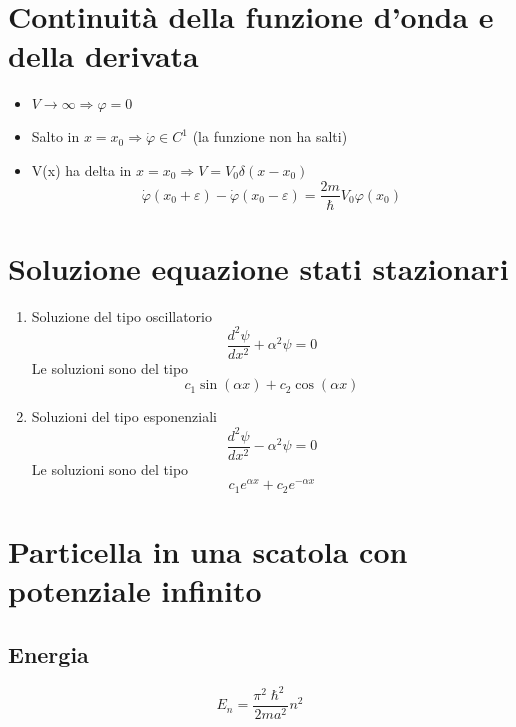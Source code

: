 \documentclass[a4paper,11pt]{report}
\theoremstyle{remark}
\theoremstyle{definition}
\begin{document}
\section{Continuità della funzione d'onda e della derivata}

\begin{itemize}
    \item $V \to \infty \Rightarrow \varphi = 0$
    \item Salto in $x = x_0 \Rightarrow \dot{\varphi} \in C^1$ (la funzione non ha salti)
    \item V(x) ha delta in $x = x_0 \Rightarrow V = V_0 \delta(x-x_0)$
    \begin{equation*}
        \dot{\varphi}(x_0 + \varepsilon) - \dot{\varphi}(x_0 - \varepsilon) = \frac{2m}{\hslash}V_0 \varphi(x_0)
    \end{equation*}
\end{itemize}

\section{Soluzione equazione stati stazionari}

\begin{enumerate}
    \item Soluzione del tipo oscillatorio
    \begin{equation*}
        \frac{d^2 \psi}{dx^2} + \alpha^2\psi = 0
    \end{equation*}
    Le soluzioni sono del tipo
    \begin{equation*}
        c_1\sin(\alpha x) + c_2\cos(\alpha x)
    \end{equation*}
    \item Soluzioni del tipo esponenziali
    \begin{equation*}
        \frac{d^2 \psi}{dx^2} - \alpha^2\psi = 0
    \end{equation*}
    Le soluzioni sono del tipo
    \begin{equation*}
        c_1 e^{\alpha x} + c_2 e^{-\alpha x}
    \end{equation*}
\end{enumerate}

\section{Particella in una scatola con potenziale infinito}
\subsection{Energia}
\begin{equation*}
    E_n = \frac{\pi^2\hslash^2}{2ma^2}n^2
\end{equation*}
\end{document}
